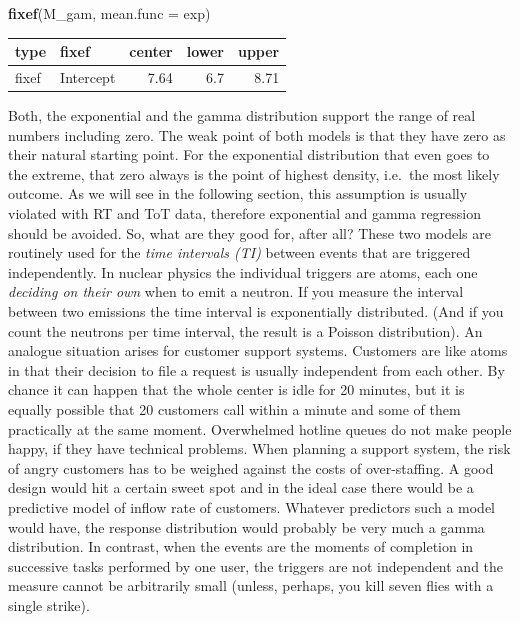 \documentclass[]{svmono}
\newenvironment{Shaded}{\begin{snugshade}}{\end{snugshade}}
\newcommand{\KeywordTok}[1]{\textcolor[rgb]{0.13,0.29,0.53}{\textbf{#1}}}
\newcommand{\DataTypeTok}[1]{\textcolor[rgb]{0.13,0.29,0.53}{#1}}
\newcommand{\NormalTok}[1]{#1}
\begin{document}
\begin{Shaded}
\begin{Highlighting}[]
\KeywordTok{fixef}\NormalTok{(M_gam, }\DataTypeTok{mean.func =}\NormalTok{ exp)}
\end{Highlighting}
\end{Shaded}

\begin{longtable}[]{@{}llrrr@{}}
\toprule
type & fixef & center & lower & upper\tabularnewline
\midrule
\endhead
fixef & Intercept & 7.64 & 6.7 & 8.71\tabularnewline
\bottomrule
\end{longtable}

Both, the exponential and the gamma distribution support the range of
real numbers including zero. The weak point of both models is that they
have zero as their natural starting point. For the exponential
distribution that even goes to the extreme, that zero always is the
point of highest density, i.e.~the most likely outcome. As we will see
in the following section, this assumption is usually violated with RT
and ToT data, therefore exponential and gamma regression should be
avoided. So, what are they good for, after all? These two models are
routinely used for the \emph{time intervals (TI)} between events that
are triggered independently. In nuclear physics the individual triggers
are atoms, each one \emph{deciding on their own} when to emit a neutron.
If you measure the interval between two emissions the time interval is
exponentially distributed. (And if you count the neutrons per time
interval, the result is a Poisson distribution). An analogue situation
arises for customer support systems. Customers are like atoms in that
their decision to file a request is usually independent from each other.
By chance it can happen that the whole center is idle for 20 minutes,
but it is equally possible that 20 customers call within a minute and
some of them practically at the same moment. Overwhelmed hotline queues
do not make people happy, if they have technical problems. When planning
a support system, the risk of angry customers has to be weighed against
the costs of over-staffing. A good design would hit a certain sweet spot
and in the ideal case there would be a predictive model of inflow rate
of customers. Whatever predictors such a model would have, the response
distribution would probably be very much a gamma distribution. In
contrast, when the events are the moments of completion in successive
tasks performed by one user, the triggers are not independent and the
measure cannot be arbitrarily small (unless, perhaps, you kill seven
flies with a single strike).
\end{document}
